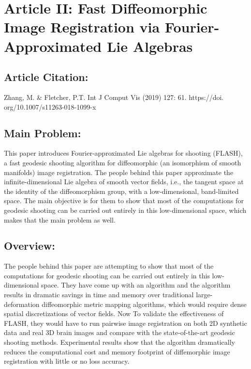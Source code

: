 \documentclass{article}
\begin{document}
\newpage

\section*{Article II: Fast Diffeomorphic Image Registration via Fourier-Approximated Lie Algebras}

\subsection*{Article Citation:} 

\begin{adjustwidth}{1cm}{}
	Zhang, M. \& Fletcher, P.T. Int J Comput Vis (2019) 127: 61. https://doi.
	org/10.1007/s11263-018-1099-x
\end{adjustwidth}


\subsection*{Main Problem:} 

\begin{adjustwidth}{1cm}{}
This paper introduces Fourier-approximated Lie algebras for shooting (FLASH), a fast geodesic shooting algorithm for diffeomorphic (an isomorphism of smooth manifolds) image registration. The people behind this paper approximate the infinite-dimensional Lie algebra of smooth vector fields, i.e., the tangent space at the identity of the diffeomorphism group, with a low-dimensional, band-limited space. The main objective is for them to show that most of the computations for geodesic shooting can be carried out entirely in this low-dimensional space, which makes that the main problem as well.
\end{adjustwidth}
\subsection*{Overview:} 

\begin{adjustwidth}{1cm}{}
	The people behind this paper are attempting to show that most of the computations for geodesic shooting can be carried out entirely in this low-dimensional space. They have come up with an algorithm and the algorithm results in dramatic savings in time and memory over traditional large-deformation diffeomorphic metric mapping algorithms, which would require dense spatial discretizations of vector fields. Now To validate the effectiveness of FLASH, they would have to run pairwise image registration on both 2D synthetic data and real 3D brain images and compare with the state-of-the-art geodesic shooting methods. Experimental results show that the algorithm dramatically reduces the computational cost and memory footprint of diffemorphic image registration with little or no loss accuracy.
\end{adjustwidth}
\end{document}
